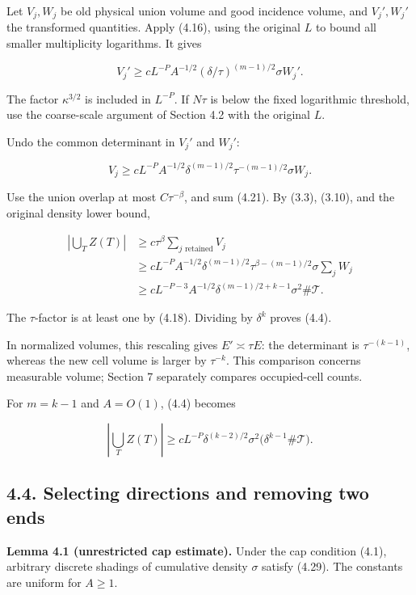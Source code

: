 \documentclass[
  11pt,
  a4paper,
]{article}
\begin{document}
Let \(V_j,W_j\) be old physical union volume and good incidence volume,
and \(V_j',W_j'\) the transformed quantities. Apply (4.16), using the
original \(L\) to bound all smaller multiplicity logarithms. It gives

\[V_j'\ge cL^{-P} A^{-1/2}(\delta/\tau)^{(m-1)/2}
 \sigma W_j'.
\tag{4.20}\label{eq:4.20}\]

The factor \(\kappa^{3/2}\) is included in \(L^{-P}\). If \(N\tau\) is
below the fixed logarithmic threshold, use the coarse-scale argument of
Section 4.2 with the original \(L\).

Undo the common determinant in \(V_j'\) and \(W_j'\):

\[V_j\ge cL^{-P} A^{-1/2}\delta^{(m-1)/2}
 \tau^{-(m-1)/2}\sigma W_j.
\tag{4.21}\label{eq:4.21}\]

Use the union overlap at most \(C\tau^{-\beta}\), and sum (4.21). By
(3.3), (3.10), and the original density lower bound,

\[\begin{aligned}
 |\bigcup_T Z(T)|
 &\ge c\tau^\beta\sum_{j\text{ retained}}V_j\\
 &\ge cL^{-P} A^{-1/2}\delta^{(m-1)/2}
 \tau^{\beta-(m-1)/2}\sigma\sum_jW_j\\
 &\ge cL^{-P-3} A^{-1/2}
 \delta^{(m-1)/2+k-1}\sigma^2\#\mathcal T.
 \end{aligned}
\tag{4.22}\label{eq:4.22}\]

The \(\tau\)-factor is at least one by (4.18). Dividing by \(\delta^k\)
proves (4.4).

In normalized volumes, this rescaling gives \(E'\asymp\tau E\): the
determinant is \(\tau^{-(k-1)}\), whereas the new cell volume is larger
by \(\tau^{-k}\). This comparison concerns measurable volume; Section 7
separately compares occupied-cell counts.

For \(m=k-1\) and \(A=O(1)\), (4.4) becomes

\[|\bigcup_T Z(T)|
 \ge cL^{-P}\delta^{(k-2)/2}\sigma^2
 \bigl(\delta^{k-1}\#\mathcal T\bigr).
\tag{4.23}\label{eq:4.23}\]

\hypertarget{selecting-directions-and-removing-two-ends}{%
\subsection{4.4. Selecting directions and removing two
ends}\label{selecting-directions-and-removing-two-ends}}

\textbf{Lemma 4.1 (unrestricted cap estimate).} Under the cap condition
(4.1), arbitrary discrete shadings of cumulative density \(\sigma\)
satisfy (4.29). The constants are uniform for \(A\ge1\).
\end{document}
